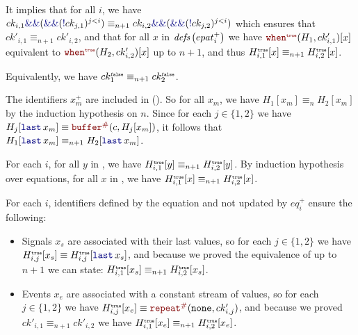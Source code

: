 \begin{skippableproof}
\begin{itemize}
              It implies that for all $i$, we have $ck_{i, 1} \kwf{\&\&} (\kwf{\&\&}(\kwf{!}ck_{j,
                      1})^{j < i}) \equiv_{n+1} ck_{i, 2} \kwf{\&\&} (\kwf{\&\&}(\kwf{!}ck_{j, 2}
                  )^{j < i})$ which ensures that $ck'_{i, 1} \equiv_{n+1} ck'_{i, 2}$, and that for
              all $x$ in ${\textit{defs}\left(epat_i^+\right)}$ we have
              $\whenT{H_1}{ck'_{i, 1}}[x]$ equivalent to $\whenT{H_2}{ck'_{i, 2}}[x]$
              up to $n+1$, and thus $H^{\mbox{\tiny\ensuremath{\mathtt{{true}}}}}_{i, 1}[x] \equiv_{n+1} H^{\mbox{\tiny\ensuremath{\mathtt{{true}}}}}_{i, 2}[x]$.

              Equivalently, we have $ck^{\mbox{\tiny\ensuremath{\mathtt{{false}}}}}_1 \equiv_{n+1} ck^{\mbox{\tiny\ensuremath{\mathtt{{false}}}}}_2$.

              The identifiers $x_m^+$ are included in
               ().
              So for all $x_m$, we have $H_1[x_m] \equiv_n H_2[x_m]$ by the induction hypothesis on
              $n$. Since for each $j \in \{1,2\}$ we have $H_j[\last{x_m}] \equiv \buffer{c}
                  {H_j[x_m]}$, it follows that $H_1[\last{x_m}] \equiv_{n+1} H_2[\last{x_m}]$.

              For each $i$, for all $y$ in , we have $H^{\mbox{\tiny\ensuremath{\mathtt{{true}}}}}_{i, 1}[y] \equiv_{n+1}
                  H^{\mbox{\tiny\ensuremath{\mathtt{{true}}}}}_{i, 2}[y]$. By induction hypothesis over equations, for all $x$ in
              , we have $H^{\mbox{\tiny\ensuremath{\mathtt{{true}}}}}_{i, 1}[x] \equiv_{n+1} H^{\mbox{\tiny\ensuremath{\mathtt{{true}}}}}_{i, 2}[x]$.

              For each $i$, identifiers defined by the  equation and not updated by
              $eq_i^+$ ensure the following:
              \begin{itemize}
                  \item Signals $x_s$ are associated with their last values, so for each $j \in \{1,
                            2\}$ we have $H^\T_{i, j}[x_s] \equiv H^\T_{i, j}[\last{x_s}]$, and
                        because we proved the equivalence of  up to $n+1$ we can state:
                        $H^{\mbox{\tiny\ensuremath{\mathtt{{true}}}}}_{i, 1}[x_s] \equiv_{n+1} H^{\mbox{\tiny\ensuremath{\mathtt{{true}}}}}_{i, 2}[x_s]$.

                  \item Events $x_e$ are associated with a constant stream of \none values, so
                        for each $j \in \{1, 2\}$ we have $H^\T_{i, j}[x_e] \equiv \const{\none}
                            {ck'_{i, j}}$, and because we proved $ck'_{i, 1} \equiv_{n+1}
                            ck'_{i, 2}$ we have $H^{\mbox{\tiny\ensuremath{\mathtt{{true}}}}}_{i, 1}[x_e] \equiv_{n+1} H^{\mbox{\tiny\ensuremath{\mathtt{{true}}}}}_{i, 2}[x_e]$.
              \end{itemize}


\end{itemize}
\end{skippableproof}
